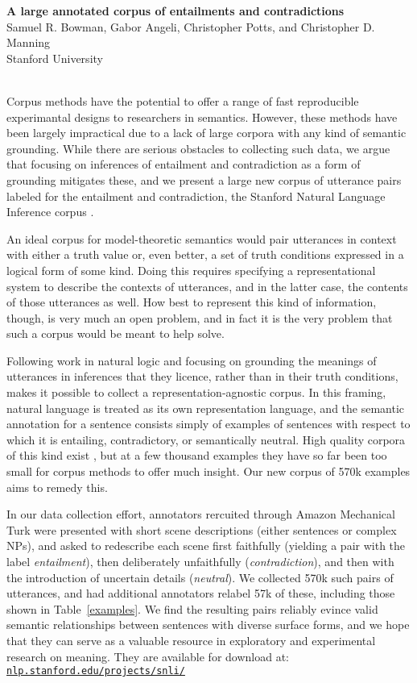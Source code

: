 \documentclass[12pt]{article} %
\def\ii#1{\textit{#1}}
\begin{document}
{\centering \textbf{A large annotated corpus of entailments and contradictions}\\
 Samuel R. Bowman, Gabor Angeli, Christopher Potts, and Christopher D. Manning\\
 Stanford University\\~\\
 }

Corpus methods have the potential to offer a range of fast reproducible experimantal designs to researchers in semantics. However, these methods have been largely impractical due to a lack of large corpora with any kind of semantic grounding. While there are serious obstacles to collecting such data, we argue that focusing on inferences of entailment and contradiction as a form of grounding mitigates these, and we present a large new corpus of utterance pairs labeled for the  entailment and contradiction, the Stanford Natural Language Inference corpus \citep[introduced earlier this year in][]{snli:emnlp2015}.

An ideal corpus for model-theoretic semantics would pair utterances in context with either a truth value or, even better, a set of truth conditions expressed in a logical form of some kind. Doing this requires specifying a representational system to describe the contexts of utterances, and in the latter case, the contents of those utterances as well. How best to represent this kind of information, though, is very much an open problem, and in fact it is the very problem that such a corpus would be meant to help solve.

Following work in natural logic \citep{Moss09} and focusing on grounding the meanings of utterances in inferences that they licence, rather than in their truth conditions, makes it possible to collect a representation-agnostic corpus. In this framing, natural language is treated as its own representation language, and the semantic annotation for a sentence consists simply of examples of sentences with respect to which it is entailing, contradictory, or semantically neutral. High quality corpora of this kind exist \citep{dagan2006pascal, marelli2014sick}, but at a few thousand examples they have so far been too small for corpus methods to offer much insight. Our new corpus of 570k examples aims to remedy this.

In our data collection effort, annotators rercuited through Amazon Mechanical Turk were presented with short scene descriptions (either sentences or complex NPs), and asked to redescribe each scene first faithfully (yielding a pair with the label \ii{entailment}), then deliberately unfaithfully (\ii{contradiction}), and then with the introduction of uncertain details (\ii{neutral}). We collected 570k such pairs of utterances, and had additional annotators relabel 57k of these, including those shown in Table~\ref{examples}.  We find the resulting pairs reliably evince valid semantic relationships between sentences with diverse surface forms, and we hope that they can serve as a valuable resource in exploratory and experimental research on meaning. They are available for download at: \href{http://nlp.stanford.edu/projects/snli/}{\texttt{nlp.stanford.edu/projects/snli/}}
\end{document}
